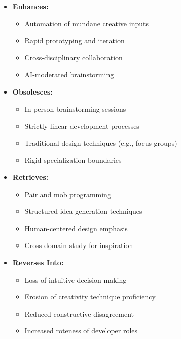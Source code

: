 \begin{itemize}
    \item \textbf{Enhances:}
          \begin{itemize}
              \item Automation of mundane creative inputs
              \item Rapid prototyping and iteration
              \item Cross-disciplinary collaboration
              \item AI-moderated brainstorming
          \end{itemize}

    \item \textbf{Obsolesces:}
          \begin{itemize}
              \item In-person brainstorming sessions
              \item Strictly linear development processes
              \item Traditional design techniques (e.g., focus groups)
              \item Rigid specialization boundaries
          \end{itemize}

    \item \textbf{Retrieves:}
          \begin{itemize}
              \item Pair and mob programming
              \item Structured idea-generation techniques
              \item Human-centered design emphasis
              \item Cross-domain study for inspiration
          \end{itemize}

    \item \textbf{Reverses Into:}
          \begin{itemize}
              \item Loss of intuitive decision-making
              \item Erosion of creativity technique proficiency
              \item Reduced constructive disagreement
              \item Increased roteness of developer roles
          \end{itemize}
\end{itemize}
